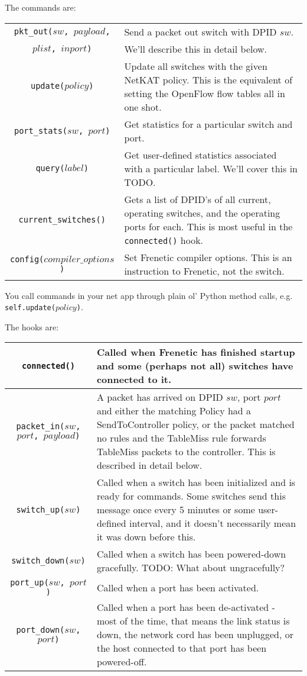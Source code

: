 The commands are:

\bigskip
\begin{tabularx}{6in}{|c|X|}
\hline\hline
\texttt{pkt\_out($sw$, $payload$,} & Send a packet out switch with DPID $sw$.  
\\
\texttt{$plist$, $inport$)} & We'll describe this in detail below.
\\ \hline  
\texttt{update($policy$)} & 
Update all switches with the given NetKAT policy.
This is the equivalent of setting the OpenFlow flow tables all in one shot.  
\\ \hline  
\texttt{port\_stats($sw$, $port$)} & Get statistics for a particular switch and port. 
\\ \hline  
\texttt{query($label$)} & Get user-defined statistics associated with a particular label. 
We'll cover this in TODO.
\\ \hline  
\texttt{current\_switches()} & Gets a list of DPID's of all current, operating switches, and the operating
ports for each.  
This is most useful in the \texttt{connected()} hook.  
\\ \hline  
\texttt{config($compiler\_options$)} & Set Frenetic compiler options.  
This is an instruction to Frenetic, not the switch. 
\\ \hline\hline
\end{tabularx}

\bigskip
You call commands in your net app through plain ol' Python method calls, e.g. \texttt{self.update($policy$)}.  

The hooks are:

\bigskip
\begin{tabularx}{6in}{|c|X|}
\hline\hline
\texttt{connected()} & Called when Frenetic has finished startup and some (perhaps not all) 
switches have connected to it. 
\\ \hline
\texttt{packet\_in($sw$, $port$, $payload$)} & 
 A packet has arrived on DPID $sw$, port $port$ and either the matching Policy had a SendToController policy, or
 the packet matched no rules and the TableMiss rule forwards TableMiss packets to the controller.
 This is described in detail below.
\\ \hline  
\texttt{switch\_up($sw$)} & Called when a switch has been initialized and is ready for commands.  
Some switches send this message once every 5 minutes or some user-defined interval, and it doesn't necessarily
mean it was down before this.
\\ \hline  
\texttt{switch\_down($sw$)} & Called when a switch has been powered-down gracefully.
TODO: What about ungracefully?
\\ \hline  
\texttt{port\_up($sw$, $port$)} & Called when a port has been activated.
\\ \hline  
\texttt{port\_down($sw$, $port$)} & Called when a port has been de-activated - most of the time, that means the link
status is down, the network cord has been unplugged, or the host connected to that port has been powered-off.
\\ \hline\hline
\end{tabularx}

